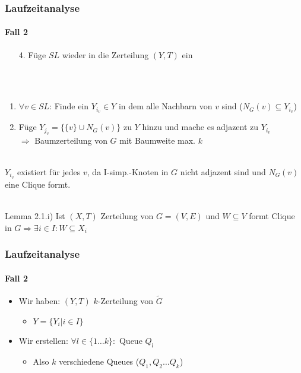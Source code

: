 \begin{frame}
\frametitle{Laufzeitanalyse}
\framesubtitle{Fall 2}

\begin{enumerate}
	\item[4.] Füge $SL$ wieder in die Zerteilung $(Y,T)$ ein
\end{enumerate}
\ \\
\ \\
\begin{enumerate}
	\item $\forall v \in SL$: Finde ein $Y_{i_v} \in Y$ in dem alle Nachbarn von $v$ sind ($N_G(v) \subseteq Y_{i_v}$)
	\item Füge $Y_{j_v} = \{ \{v\} \cup N_G(v) \}$ zu $Y$ hinzu und mache es adjazent zu $Y_{i_v}$ \\
	$\Rightarrow$ Baumzerteilung von $G$ mit Baumweite max. $k$
\end{enumerate}
\ \\



$Y_{i_v}$ existiert für jedes $v$, da I-simp.-Knoten in $G$ nicht adjazent sind und $N_G(v)$ eine Clique formt. \\
\ \\
\begin{KITinfoblock}{Lemma 2.1.i)}
	Ist $(X,T)$ Zerteilung von $G=(V,E)$ und $W \subseteq V$ formt Clique in $G \Rightarrow \exists i \in I: W \subseteq X_i$
\end{KITinfoblock}

\end{frame}


\begin{frame}
\frametitle{Laufzeitanalyse}
\framesubtitle{Fall 2}

\begin{itemize}
	\item Wir haben: $(Y,T)$ $k$-Zerteilung von $\widetilde{G}$
	\begin{itemize}
		\item $Y = \{ Y_i | i \in I \}$
	\end{itemize}

	\item Wir erstellen: $\forall l \in \{1 \dots k\}:$ Queue $Q_l$
	\begin{itemize}
		\item Also $k$ verschiedene Queues ($Q_1, Q_2 \dots Q_k$)
	\end{itemize}
\end{itemize}

\end{frame}


